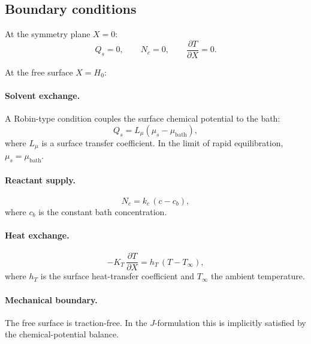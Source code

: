 \documentclass[aps,pre,reprint,superscriptaddress,longbibliography,floatfix]{revtex4-2}
\begin{document}
\subsection{Boundary conditions}

At the symmetry plane $X=0$:
\begin{equation}
  Q_s = 0, \qquad N_c = 0, \qquad \frac{\partial T}{\partial X} = 0.
  \label{eq:bc_sym}
\end{equation}

At the free surface $X=H_0$:

\paragraph{Solvent exchange.}
A Robin-type condition couples the surface chemical potential to the bath:
\begin{equation}
  Q_s = L_\mu\!\left(\mu_s - \mu_\mathrm{bath}\right),
  \label{eq:bc_mu}
\end{equation}
where $L_\mu$ is a surface transfer coefficient. In the limit of rapid equilibration, $\mu_s = \mu_\mathrm{bath}$.

\paragraph{Reactant supply.}
\begin{equation}
  N_c = k_c\,(c - c_b),
  \label{eq:bc_c}
\end{equation}
where $c_b$ is the constant bath concentration.

\paragraph{Heat exchange.}
\begin{equation}
  -K_T\,\frac{\partial T}{\partial X} = h_T\,(T - T_\infty),
  \label{eq:bc_T}
\end{equation}
where $h_T$ is the surface heat-transfer coefficient and $T_\infty$ the ambient temperature.

\paragraph{Mechanical boundary.}
The free surface is traction-free. In the $J$-formulation this is implicitly satisfied by the chemical-potential balance.

\end{document}

